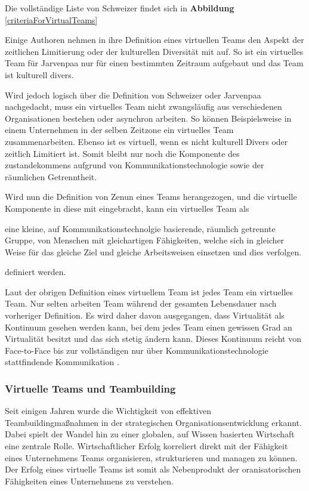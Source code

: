 \documentclass[a4paper,11pt]{article}%
\renewcommand{\\}{\vspace*{0.5\baselineskip} \newline}
\begin{document}
Die vollständige Liste von Schweizer findet sich in \textbf{Abbildung} \autoref{criteriaForVirtualTeams}

Einige Authoren nehmen in ihre Definition eines virtuellen Teams den Aspekt der zeitlichen Limitierung oder der kulturellen Diversität mit auf. So ist ein virtuelles Team für Jarvenpaa \citep[p.1-2]{jarvenpaa1999communication} nur für einen bestimmten Zeitraum aufgebaut und das Team ist kulturell divers. 

Wird jedoch logisch über die Definition von Schweizer oder Jarvenpaa nachgedacht, muss ein virtuelles Team nicht zwangsläufig aus verschiedenen Organisationen bestehen oder asynchron arbeiten. So können Beispielsweise in einem Unternehmen in der selben Zeitzone ein virtuelles Team zusammenarbeiten. Ebenso ist es virtuell, wenn es nicht kulturell Divers oder zeitlich Limitiert ist.
Somit bleibt nur noch die Komponente des zustandekommens aufgrund von Kommunikationstechnologie sowie der räumlichen Getrenntheit.

Wird nun die Definition von Zenun \citep[p.2]{zenun2007effects} eines Teams herangezogen, und die virtuelle Komponente in diese mit eingebracht, kann ein virtuelles Team als

\flqq eine kleine, auf Kommunikationstechnolgie basierende, räumlich getrennte Gruppe, von Menschen mit gleichartigen Fähigkeiten, welche sich in gleicher Weise für das gleiche Ziel und gleiche Arbeitsweisen einsetzen und dies verfolgen.\frqq 

definiert werden.

Laut der obrigen Definition eines virtuellem Team ist jedes Team ein virtuelles Team. Nur selten arbeiten Team während der gesamten Lebensdauer nach vorheriger Definition. Es wird daher davon ausgegangen, dass Virtualität als Kontinuum gesehen werden kann, bei dem jedes Team einen gewissen Grad an Virtualität besitzt und das sich stetig ändern kann. Dieses Kontinuum reicht von Face-to-Face bis zur vollständigen nur über Kommunikationstechnologie stattfindende Kommunikation \cite{martins2004virtual}.


		\subsubsection{Virtuelle Teams und Teambuilding}

Seit einigen Jahren wurde die Wichtigkeit von effektiven Teambuildingmaßnahmen in der strategischen Organisationsentwicklung erkannt. Dabei spielt der Wandel hin zu einer globalen, auf Wissen basierten Wirtschaft eine zentrale Rolle. \citep{belbin2011management} \citep[p.7]{katzenbach2015wisdom}
Wirtschaftlicher Erfolg korreliert direkt mit der Fähigkeit eines Unternehmens Teams organisieren, strukturieren und managen zu können. \citep{pasmore1993designing}
Der Erfolg eines virtuelle Teams ist somit als Nebenprodukt der oranisatorischen Fähigkeiten eines Unternehmens zu verstehen. \citep[Chapter.5]{kling1994social}
\end{document}
